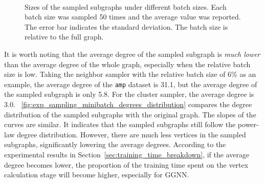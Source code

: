\begin{figure}[h]
    \centering
     \\
    \caption{Sizes of the sampled subgraphs under different batch sizes. Each batch size was sampled 50 times and the average value was reported. The error bar indicates the standard deviation. The batch size is relative to the full graph.}
    \label{fig:exp_sampling_minibatch_graph_info}
\end{figure}

It is worth noting that the average degree of the sampled subgraph is \emph{much lower} than the average degree of the whole graph, especially when the relative batch size is low.
Taking the neighbor sampler with the relative batch size of 6\% as an example, the average degree of the \texttt{amp} dataset is 31.1, but the average degree of the sampled subgraph is only 5.8.
For the cluster sampler, the average degree is 3.0.
\figurename~\ref{fig:exp_sampling_minibatch_degrees_distribution} compares the degree distribution of the sampled subgraphs with the original graph.
The slopes of the curves are similar.
It indicates that the sampled subgraphs still follow the power-law degree distribution.
However, there are much less vertices in the sampled subgraphs, significantly lowering the average degrees.
According to the experimental results in Section~\ref{sec:training_time_breakdown}, if the average degree becomes lower, the proportion of the training time spent on the vertex calculation stage will become higher, especially for GGNN.

